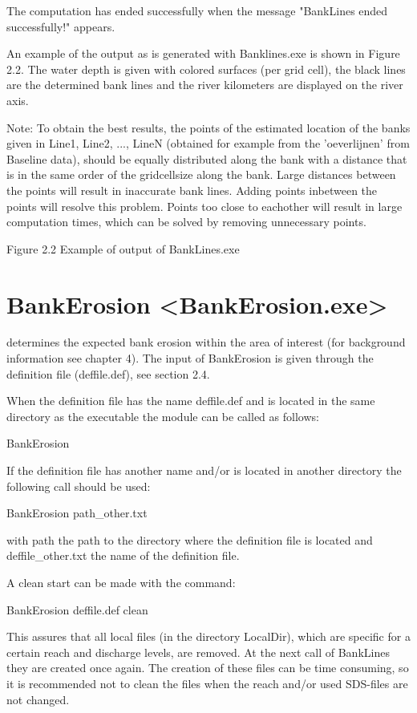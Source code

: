 The computation has ended successfully when the message "BankLines ended successfully!" appears.

An example of the output as is generated with Banklines.exe is shown in Figure 2.2.
The water depth is given with colored surfaces (per grid cell), the black lines are the determined bank lines and the river kilometers are displayed on the river axis.

Note: To obtain the best results, the points of the estimated location of the banks given in  Line1, Line2, ..., LineN (obtained for example from the 'oeverlijnen' from Baseline data), should be equally distributed along the bank with a distance that is in the same order of the gridcellsize along the bank.
Large distances between the points will result in inaccurate bank lines.
Adding points inbetween the points will resolve this problem.
Points too close to eachother will result in large computation times, which can be solved by removing unnecessary points.

Figure 2.2	Example of output of  BankLines.exe


\section{BankErosion <BankErosion.exe>}

determines the expected bank erosion within the area of interest (for background information see chapter 4).
The input of BankErosion  is given through the definition file (deffile.def), see section 2.4.

When the definition file has the name deffile.def and is located in the same directory as the executable the module can be called as follows:

BankErosion

If the definition file has another name and/or is located in another directory the following call should be used:

BankErosion path_other.txt

with path the path to the directory where the definition file is located and deffile_other.txt the name of the definition file.

A clean start can be made with the command:

BankErosion deffile.def clean

This assures that all local files (in the directory LocalDir), which are specific for a certain reach and discharge levels, are removed.
At the next call of BankLines they are created once again.
The creation of these files can be time consuming, so it is recommended not to clean the files when the reach and/or used SDS-files are not changed.

